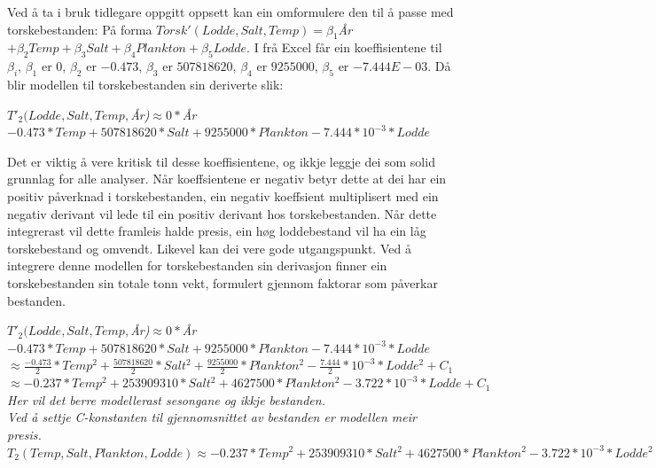 \documentclass{report}
\begin{document}
Ved å ta i bruk tidlegare oppgitt oppsett kan ein omformulere den til å passe med torskebestanden: \newline 
På forma $Torsk'(Lodde,Salt,Temp)=\beta_1$\textit{År}$ +\beta_2 Temp+ \beta_3 Salt + \beta_4 Plankton+\beta_5 Lodde$.
I frå Excel får ein koeffisientene til $\beta_i$, $\beta_1$ er $0$, $\beta_2$ er $-0.473$, $\beta_3$ er $507818620$, $\beta_4$ er $9255000$, $\beta_5$ er $-7.444E-03$.
Då blir modellen til torskebestanden sin deriverte slik:
\begin{center}
    $T'_{2}(Lodde,Salt,Temp,$\textit{År)}$ \approx 0*$\textit{År}$ -0.473*Temp + 507818620*Salt + 9255000*Plankton - 7.444*10^{-3}*Lodde$
\end{center}
Det er viktig å vere kritisk til desse koeffisientene, og ikkje leggje dei som solid grunnlag for alle analyser.
Når koeffsientene er negativ betyr dette at dei har ein positiv påverknad i torskebestanden, ein negativ koeffsient multiplisert med ein negativ derivant vil lede til ein positiv derivant hos torskebestanden.
Når dette integrerast vil dette framleis halde presis, ein høg loddebestand vil ha ein låg torskebestand og omvendt.
Likevel kan dei vere gode utgangspunkt. Ved å integrere denne modellen for torskebestanden sin derivasjon finner ein torskebestanden sin totale tonn vekt, formulert gjennom faktorar som påverkar bestanden.

\begin{center} 
    $T'_{2}(Lodde,Salt,Temp,$\textit{År)}$ \approx 0*$\textit{År}$-0.473*Temp + 507818620*Salt + 9255000*Plankton - 7.444*10^{-3}*Lodde $\\
    $\approx \frac{-0.473}{2}*Temp^2 + \frac{507818620}{2}*Salt^2 + \frac{9255000}{2}*Plankton^2  -\frac{7.444}{2}*10^{-3}*Lodde^2 + C_1$\\
    $\approx -0.237*Temp^2 + 253909310*Salt^2 + 4627500*Plankton^2 -3.722*10^{-3}*Lodde + C_1$\\
     \textit{Her vil det berre modellerast sesongane og ikkje bestanden.}\\
     \textit{Ved å settje C-konstanten til gjennomsnittet av bestanden er modellen meir presis.}\\
    $T_{2}(Temp,Salt,Plankton,Lodde) \approx -0.237*Temp^2 + 253909310*Salt^2 + 4627500*Plankton^2 -3.722*10^{-3}*Lodde^2 + 531481$
\end{center}
\end{document}
